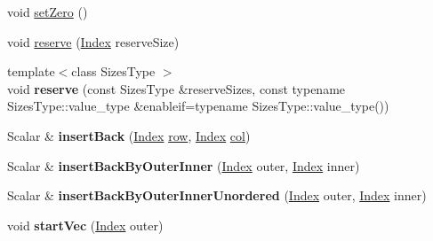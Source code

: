 \begin{DoxyCompactItemize}
\item 
void \mbox{\hyperlink{class_eigen_1_1_sparse_matrix_ad3c7416090f913e8685523cb3ab7c2f7}{set\+Zero}} ()
\item 
void \mbox{\hyperlink{class_eigen_1_1_sparse_matrix_a1518e58ac49bed0e2385b722a034f7d3}{reserve}} (\mbox{\hyperlink{struct_eigen_1_1_eigen_base_a554f30542cc2316add4b1ea0a492ff02}{Index}} reserve\+Size)
\item 
\mbox{\label{class_eigen_1_1_sparse_matrix_a275bd616a8f4cbfd8e89f64ed941c775}} 
{\footnotesize template$<$class Sizes\+Type $>$ }\\void {\bfseries reserve} (const Sizes\+Type \&reserve\+Sizes, const typename Sizes\+Type\+::value\+\_\+type \&enableif=typename Sizes\+Type\+::value\+\_\+type())
\item 
\mbox{\label{class_eigen_1_1_sparse_matrix_ad1478330c8accf34998e92af78f59814}} 
Scalar \& {\bfseries insert\+Back} (\mbox{\hyperlink{struct_eigen_1_1_eigen_base_a554f30542cc2316add4b1ea0a492ff02}{Index}} \mbox{\hyperlink{class_eigen_1_1_sparse_matrix_base_ac0a5563ed3f243f013fb9d2c17e230d0}{row}}, \mbox{\hyperlink{struct_eigen_1_1_eigen_base_a554f30542cc2316add4b1ea0a492ff02}{Index}} \mbox{\hyperlink{class_eigen_1_1_sparse_matrix_base_a8f4eaa3c3921ef3823ffc69ebcc356af}{col}})
\item 
\mbox{\label{class_eigen_1_1_sparse_matrix_a0ed7b169210d6a1189f6066f0c69fba4}} 
Scalar \& {\bfseries insert\+Back\+By\+Outer\+Inner} (\mbox{\hyperlink{struct_eigen_1_1_eigen_base_a554f30542cc2316add4b1ea0a492ff02}{Index}} outer, \mbox{\hyperlink{struct_eigen_1_1_eigen_base_a554f30542cc2316add4b1ea0a492ff02}{Index}} inner)
\item 
\mbox{\label{class_eigen_1_1_sparse_matrix_a813f143769608dbe9b0973e6134261b9}} 
Scalar \& {\bfseries insert\+Back\+By\+Outer\+Inner\+Unordered} (\mbox{\hyperlink{struct_eigen_1_1_eigen_base_a554f30542cc2316add4b1ea0a492ff02}{Index}} outer, \mbox{\hyperlink{struct_eigen_1_1_eigen_base_a554f30542cc2316add4b1ea0a492ff02}{Index}} inner)
\item 
\mbox{\label{class_eigen_1_1_sparse_matrix_a28a9962fcba2190022c4ccdf91d90ddb}} 
void {\bfseries start\+Vec} (\mbox{\hyperlink{struct_eigen_1_1_eigen_base_a554f30542cc2316add4b1ea0a492ff02}{Index}} outer)

\end{DoxyCompactItemize}
